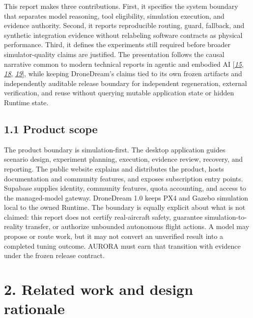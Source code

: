 This report makes three contributions. First, it specifies the system
boundary that separates model reasoning, tool eligibility, simulation
execution, and evidence authority. Second, it reports reproducible
routing, guard, fallback, and synthetic integration evidence without
relabeling software contracts as physical performance. Third, it defines
the experiments still required before broader simulator-quality claims
are justified. The presentation follows the causal narrative common to
modern technical reports in agentic and embodied AI
{[}\protect\hyperlink{ref_15}{\emph{15}},
\protect\hyperlink{ref_18}{\emph{18}},
\protect\hyperlink{ref_19}{\emph{19}}{]}, while keeping DroneDream's
claims tied to its own frozen artifacts and independently auditable
release boundary for independent regeneration, external verification,
and reuse without querying mutable application state or hidden Runtime
state.

\subsection{\texorpdfstring{\textbf{1.1 Product
scope}}{1.1 Product scope}}\label{product-scope}

The product boundary is simulation-first. The desktop application guides
scenario design, experiment planning, execution, evidence review,
recovery, and reporting. The public website explains and distributes the
product, hosts documentation and community features, and exposes
subscription entry points. Supabase supplies identity, community
features, quota accounting, and access to the managed-model gateway.
DroneDream 1.0 keeps PX4 and Gazebo simulation local to the owned
Runtime. The boundary is
equally explicit about what is not claimed: this report does not certify
real-aircraft safety, guarantee simulation-to-reality transfer, or
authorize unbounded autonomous flight actions. A model may propose or
route work, but it may not convert an unverified result into
a completed tuning outcome. AURORA must earn that transition with evidence
under the frozen release contract.

\section{\texorpdfstring{\textbf{2. Related work and design
rationale}}{2. Related work and design rationale}}\label{related-work-and-design-rationale}

